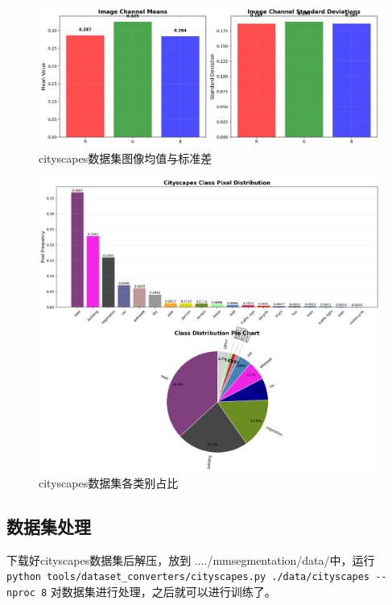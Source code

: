 \documentclass[12pt]{ctexart}
\begin{document}
\begin{figure}[htbp]  %
    \centering        %
    \includegraphics[width=\textwidth]{result/analysis/cityscapes_mean_std.png}  
    \caption{cityscapes数据集图像均值与标准差}
    \label{fig:mean_std}
\end{figure}
\begin{figure}[H]  %
    \centering        %
    \includegraphics[width=\textwidth]{result/analysis/cityscapes_class_distribution.png}  
    \caption{cityscapes数据集各类别占比}
    \label{fig:class_distribution}
\end{figure}

\subsection{数据集处理}
下载好cityscapes数据集后解压，放到 ..../mmsegmentation/data/中，运行\newline
\verb|python tools/dataset_converters/cityscapes.py ./data/cityscapes --nproc 8| \newline
对数据集进行处理，之后就可以进行训练了。
\end{document}
